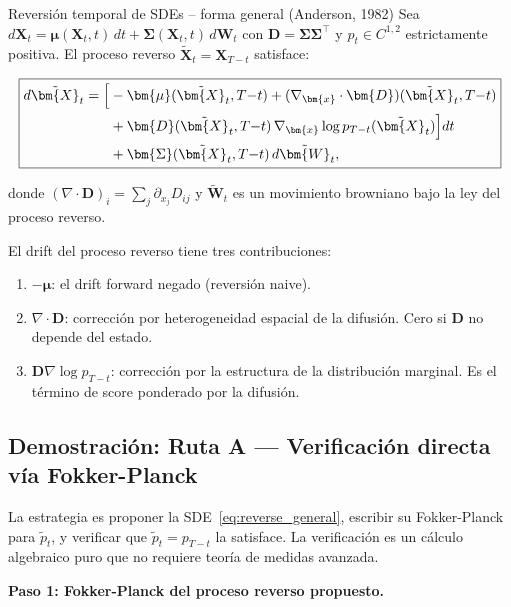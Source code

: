 \begin{teorema}{Reversión temporal de SDEs -- forma general (Anderson, 1982)}
\label{thm:anderson_general}
Sea $d\bm{X}_t = \bm{\mu}(\bm{X}_t,t)\,dt + \bm{\Sigma}(\bm{X}_t,t)\,d\bm{W}_t$
con $\bm{D} = \bm{\Sigma}\bm{\Sigma}^\top$ y $p_t \in C^{1,2}$ estrictamente
positiva. El proceso reverso $\tilde{\bm{X}}_t = \bm{X}_{T-t}$ satisface:

\begin{equation}
\boxed{
\begin{aligned}
d\tilde{\bm{X}}_t
= \Bigl[ & -\bm{\mu}(\tilde{\bm{X}}_t,T{-}t)
+ (\nabla_{\bm{x}}\cdot\bm{D})(\tilde{\bm{X}}_t,T{-}t) \\
& + \bm{D}(\tilde{\bm{X}}_t,T{-}t)\,\nabla_{\bm{x}}\log p_{T-t}(\tilde{\bm{X}}_t)
\Bigr]dt \\
& + \bm{\Sigma}(\tilde{\bm{X}}_t,T{-}t)\,d\tilde{\bm{W}}_t,
\end{aligned}
}
\label{eq:reverse_general}
\end{equation}

donde $(\nabla\cdot\bm{D})_i = \sum_j\partial_{x_j}D_{ij}$ y $\tilde{\bm{W}}_t$
es un movimiento browniano bajo la ley del proceso reverso.
\end{teorema}

El drift del proceso reverso tiene tres contribuciones:
\begin{enumerate}
  \item $-\bm{\mu}$: el drift forward negado (reversión naive).
  \item $\nabla\cdot\bm{D}$: corrección por heterogeneidad espacial de la
        difusión. Cero si $\bm{D}$ no depende del estado.
  \item $\bm{D}\nabla\log p_{T-t}$: corrección por la estructura de la
        distribución marginal. Es el término de score ponderado por la difusión.
\end{enumerate}

\subsection{Demostración: Ruta A — Verificación directa vía Fokker-Planck}
\label{subsec:anderson_ruta_a}

La estrategia es proponer la SDE~\eqref{eq:reverse_general}, escribir su
Fokker-Planck para $\tilde{p}_t$, y verificar que $\tilde{p}_t = p_{T-t}$
la satisface. La verificación es un cálculo algebraico puro que no requiere
teoría de medidas avanzada.

\medskip
\noindent\textbf{Paso 1: Fokker-Planck del proceso reverso propuesto.}

